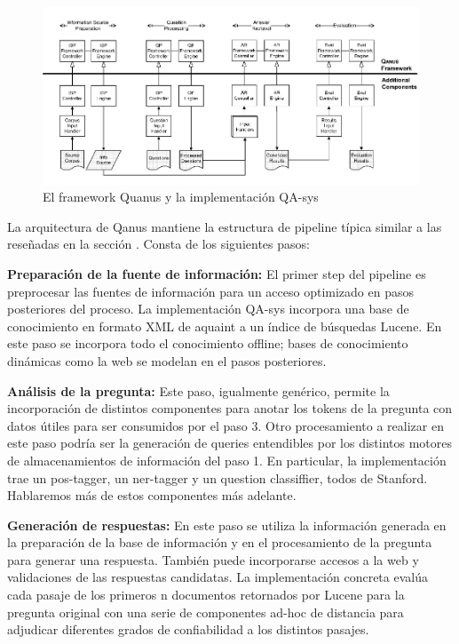 \begin{figure}
  \centering
    \includegraphics{graficos/Quanus}
  \caption{El framework Quanus y la implementación QA-sys}
  \label{fig:Quanus}
\end{figure}


La arquitectura de Qanus mantiene la estructura de pipeline típica similar a las reseñadas en la sección . 
Consta de los siguientes pasos: \newline

\textbf{Preparación de la fuente de información: } El primer step del pipeline es preprocesar las fuentes de información para un acceso optimizado en pasos posteriores del proceso. La implementación QA-sys incorpora una base de conocimiento en formato XML de aquaint a un índice de
búsquedas Lucene. En este paso se incorpora todo el conocimiento offline; bases de conocimiento dinámicas como la web se modelan en el pasos posteriores. \newline

\textbf{Análisis de la pregunta: } Este paso, igualmente genérico, permite la incorporación de
distintos componentes para anotar los tokens de la pregunta con datos
útiles para ser consumidos por el paso 3. Otro procesamiento a
realizar en este paso podría ser la generación de queries
entendibles por los distintos motores de almacenamientos de
información del paso 1. En particular, la implementación trae un
pos-tagger, un ner-tagger y un question classiffier, todos de Stanford.
Hablaremos más de estos componentes más adelante. \newline

\textbf{Generación de respuestas: } En este paso se utiliza la información generada en la preparación
de la base de información y en el procesamiento de la pregunta para
generar una respuesta. También puede incorporarse accesos a la web y
validaciones de las respuestas candidatas. La implementación concreta
evalúa cada pasaje de los primeros n documentos retornados por Lucene
para la pregunta original con una serie de componentes ad-hoc de
distancia para adjudicar diferentes grados de confiabilidad a los
distintos pasajes. \newline


